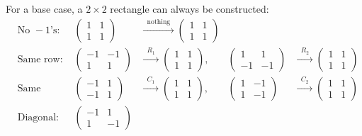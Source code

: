 \documentclass[12pt]{article}
\begin{document}
\begin{enumerate}
\begin{enumerate}
        For a base case, a $2\times 2$ rectangle can always be constructed:
        \begin{align*}
          &\text{No } -1\text{'s:} &
          \begin{pmatrix} 1 & 1 \\ 1 & 1
          \end{pmatrix}
          &\xrightarrow{\;\;\text{nothing}\;\;}
          \begin{pmatrix} 1 & 1 \\ 1 & 1
          \end{pmatrix} \\[6pt]
          &\text{Same row:} &
          \begin{pmatrix} -1 & -1 \\ 1 & 1
          \end{pmatrix}
          &\xrightarrow{\;\;R_1\;\;}
          \begin{pmatrix} 1 & 1 \\ 1 & 1
          \end{pmatrix},
          &
          \begin{pmatrix} 1 & 1 \\ -1 & -1
          \end{pmatrix}
          &\xrightarrow{\;\;R_2\;\;}
          \begin{pmatrix} 1 & 1 \\ 1 & 1
          \end{pmatrix} \\[6pt]
          &\text{Same column:} &
          \begin{pmatrix} -1 & 1 \\ -1 & 1
          \end{pmatrix}
          &\xrightarrow{\;\;C_1\;\;}
          \begin{pmatrix} 1 & 1 \\ 1 & 1
          \end{pmatrix},
          &
          \begin{pmatrix} 1 & -1 \\ 1 & -1
          \end{pmatrix}
          &\xrightarrow{\;\;C_2\;\;}
          \begin{pmatrix} 1 & 1 \\ 1 & 1
          \end{pmatrix} \\[6pt]
          &\text{Diagonal:} &
          \begin{pmatrix} -1 & 1 \\ 1 & -1

\end{pmatrix}
\end{align*}
\end{enumerate}
\end{enumerate}
\end{document}
